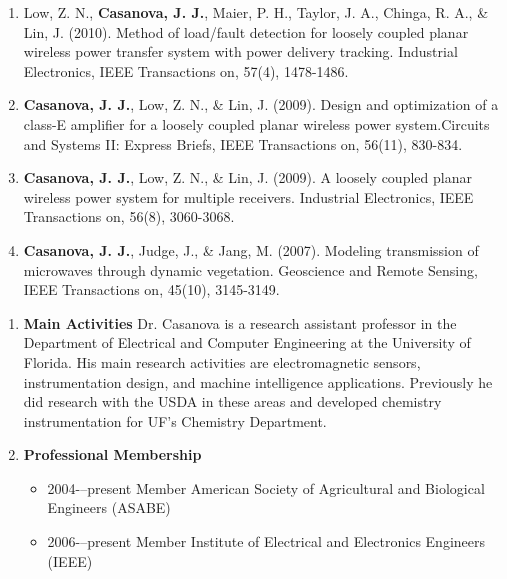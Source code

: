 \begin{enumerate}
\item Low, Z. N., \textbf{Casanova, J. J.}, Maier, P. H., Taylor, J. A., Chinga, R. A., \& Lin, J. (2010). Method of load/fault detection for loosely coupled planar wireless power transfer system with power delivery tracking. Industrial Electronics, IEEE Transactions on, 57(4), 1478-1486.

\item \textbf{Casanova, J. J.}, Low, Z. N., \& Lin, J. (2009). Design and optimization of a class-E amplifier for a loosely coupled planar wireless power system.Circuits and Systems II: Express Briefs, IEEE Transactions on, 56(11), 830-834.

\item \textbf{Casanova, J. J.}, Low, Z. N., \& Lin, J. (2009). A loosely coupled planar wireless power system for multiple receivers. Industrial Electronics, IEEE Transactions on, 56(8), 3060-3068.

\item \textbf{Casanova, J. J.}, Judge, J., \& Jang, M. (2007). Modeling transmission of microwaves through dynamic vegetation. Geoscience and Remote Sensing, IEEE Transactions on, 45(10), 3145-3149.
\end{enumerate}

\begin{enumerate}
\item \textbf{Main Activities} Dr. Casanova is a research assistant professor in the Department of Electrical and Computer Engineering at the University of Florida. His main research activities are electromagnetic sensors, instrumentation design, and machine intelligence applications. Previously he did research with the USDA in these areas and developed chemistry instrumentation for UF’s Chemistry Department.
\item \textbf{Professional Membership}
\begin{itemize}
\item 2004-–present Member American Society of Agricultural and Biological Engineers (ASABE)

\item 2006-–present Member Institute of Electrical and Electronics Engineers (IEEE)
\end{itemize}
\end{enumerate}



